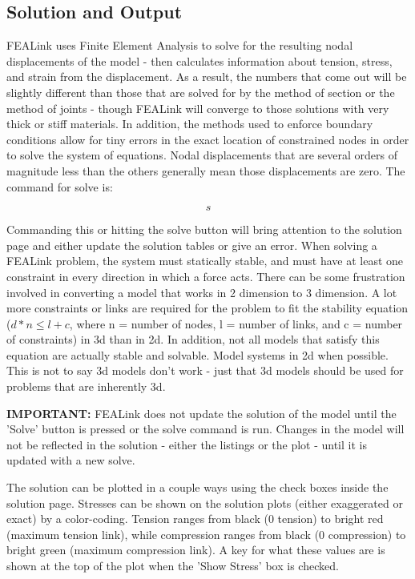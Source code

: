 \documentclass[11pt, oneside]{article}   	%
\begin{document}
\subsection{Solution and Output}
FEALink uses Finite Element Analysis to solve for the resulting nodal displacements of the model - then calculates information about tension, stress, and strain from the displacement.  As a result, the numbers that come out will be slightly different than those that are solved for by the method of section or the method of joints - though FEALink will converge to those solutions with very thick or stiff materials.  In addition, the methods used to enforce boundary conditions allow for tiny errors in the exact location of constrained nodes in order to solve the system of equations.  Nodal displacements that are several orders of magnitude less than the others generally mean those displacements are zero.  The command for solve is:

\begin{equation}
s
\end{equation}

Commanding this or hitting the solve button will bring attention to the solution page and either update the solution tables or give an error.  When solving a FEALink problem, the system must statically stable, and must have at least one constraint in every direction in which a force acts.  There can be some frustration involved in converting a model that works in 2 dimension to 3 dimension.  A lot more constraints or links are required for the problem to fit the stability equation ($d*n \leq l+c$, where n = number of nodes, l = number of links, and c = number of constraints) in 3d than in 2d.  In addition, not all models that satisfy this equation are actually stable and solvable.  Model systems in 2d when possible.  This is not to say 3d models don't work - just that 3d models should be used for problems that are inherently 3d.

\textbf{IMPORTANT:} FEALink does not update the solution of the model until the 'Solve' button is pressed or the solve command is run.  Changes in the model will not be reflected in the solution - either the listings or the plot - until it is updated with a new solve.

The solution can be plotted in a couple ways using the check boxes inside the solution page.  Stresses can be shown on the solution plots (either exaggerated or exact) by a color-coding.  Tension ranges from black (0 tension) to bright red (maximum tension link), while compression ranges from black (0 compression) to bright green (maximum compression link).  A key for what these values are is shown at the top of the plot when the 'Show Stress' box is checked.
\end{document}
